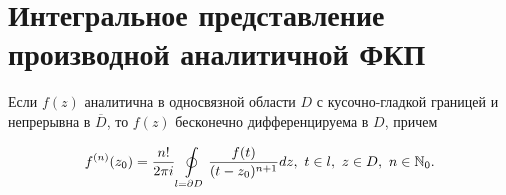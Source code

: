 \documentclass[../../main.tex]{subfiles}
\begin{document}
\section{Интегральное представление производной аналитичной ФКП}
	
\begin{thm}
	Если $f(z)$ аналитична в односвязной области $D$ 
	с кусочно-гладкой границей и непрерывна в $\overline D$, то 
	$f(z)$ бесконечно дифференцируема в $D$, причем 
	
	\begin{equation}
	\label{lec33:7}
	f^{(n)}(z_0) = \frac{n!}{2\pi i} \oint\limits_{l = \partial D}
	\frac{f(t)}{(t-z_0)^{n+1}} dz,\
	t \in l,\ z \in D,\ n \in \mathbb{N}_0.
	\end{equation}
	
\end{thm}
\end{document}
